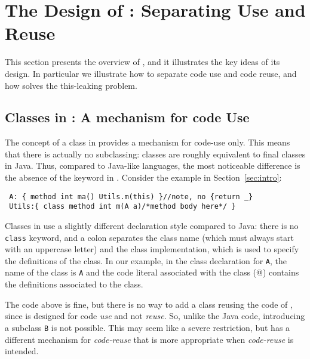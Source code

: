 \saveSpace\saveSpace\saveSpace
\section{The Design of \name: Separating Use and Reuse}\label{sec:separate}
\saveSpace\saveSpace\saveSpace
This section presents the overview of \name, and it illustrates the
key ideas of its design. In particular we illustrate how to separate code use and 
code reuse, and how \name solves the this-leaking problem.

\saveSpace\saveSpace
\subsection{Classes in \name: A mechanism for code Use}
\saveSpace
The concept of a class in \name provides a mechanism for code-use
only. This means that there is actually no subclassing:
classes are roughly equivalent to final classes in Java.  Thus,
compared to Java-like languages, the most noticeable difference is the
absence of the \Q@extends@ keyword in \name. 
Consider the example in Section~\ref{sec:intro}:
\saveSpace
\begin{lstlisting}
 A: { method int ma() Utils.m(this) }//note, no {return _}
 Utils:{ class method int m(A a)/*method body here*/ }
\end{lstlisting} 
\saveSpace
\noindent Classes in \name use a slightly different declaration style compared
to Java: there is no \lstinline{class} keyword, and a colon separates the class name (which must always start with
an uppercase letter) and the class implementation, which is used to specify the
definitions of the class. In our example, in the class declaration
for \lstinline{A}, the name of the class is \lstinline{A} and the code 
literal associated with the class (@) contains the definitions associated to the
class.


The \name code above is fine, but there is no way to add a class 
\Q@B@ reusing the code of \Q@A@, since
\Q@A@ is designed for code \emph{use} and not \emph{reuse}. So, unlike
the Java code, introducing a subclass
\lstinline{B} is not possible. This may seem like a severe restriction, but
\name has a different mechanism for \emph{code-reuse} that 
is more appropriate when \emph{code-reuse} is intended. 

